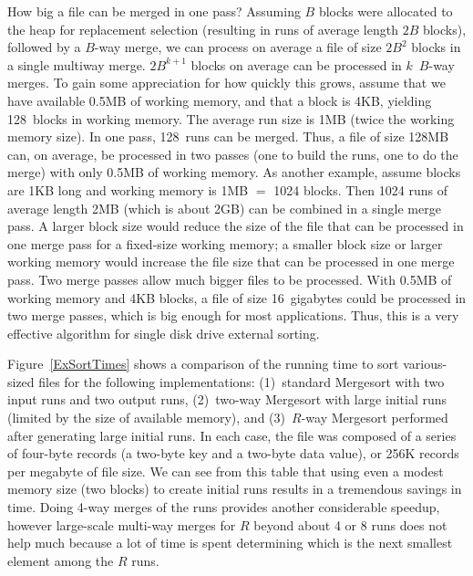 How big a file can be merged in one pass?
Assuming \(B\) blocks were allocated to the heap for
replacement selection (resulting in runs of average length \(2B\)
blocks), followed by a \(B\)-way merge, we can process
on average a file of size \(2B^2\) blocks in a single multiway merge.
\(2B^{k+1}\) blocks on average can be processed in \(k\)~\(B\)-way
merges.
To gain some appreciation for how quickly this grows, assume that we
have available 0.5MB of working memory, and that a block is
4KB, yielding 128~blocks in working memory.
The average run size is 1MB (twice the working memory size).
In one pass, 128~runs can be merged.
Thus, a file of size 128MB can, on average, be processed in two
passes (one to build the runs, one to do the merge) with only
0.5MB of working memory.
As another example, assume blocks are 1KB long and working memory
is 1MB \(=\) 1024 blocks.
Then 1024 runs of average length 2MB (which is about 2GB) can be
combined in a single merge pass.
A larger block size would reduce the size of the file that can be
processed in one merge pass for a fixed-size working memory; a smaller
block size or larger working memory would increase the file size that
can be processed in one merge pass.
Two merge passes allow much bigger files to be processed.
With 0.5MB of working memory and 4KB blocks,
a file of size 16~gigabytes could be processed in two merge passes,
which is big enough for most applications.
Thus, this is a very effective algorithm for single disk drive
external sorting.

Figure~\ref{ExSortTimes} shows a comparison of the running time to
sort various-sized files for the following implementations:
(1)~standard Mergesort with two input runs and two output runs,
(2)~two-way Mergesort with large initial runs (limited by the size of
available memory),
and (3)~\(R\)-way Mergesort performed after generating large initial
runs.
In each case, the file was composed of a series of four-byte records
(a two-byte key and a two-byte data value),
or 256K records per megabyte of file size.
We can see from this table that using even a modest memory size (two
blocks) to create initial runs results in a tremendous savings in
time.
Doing 4-way merges of the runs provides another considerable speedup,
however large-scale multi-way merges for \(R\) beyond about 4 or 8 runs
does not help much because a lot of time is spent determining which is
the next smallest element among the \(R\) runs.

